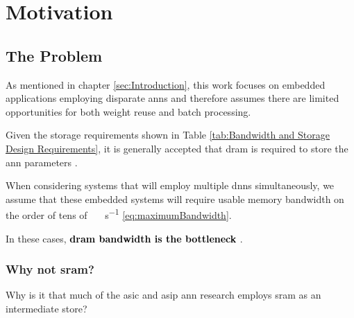 



\section{Motivation}
\label{sec:Motivation}


\subsection[The Problem]{The Problem}
\label{sec:The Problem}

As mentioned in chapter \ref{sec:Introduction}, this work focuses on embedded applications employing disparate \ac{ann}s and therefore assumes there are limited opportunities for both weight reuse and batch processing.

Given the storage requirements shown in Table \ref{tab:Bandwidth and Storage Design Requirements}, it is generally accepted that \ac{dram} is required to store the \ac{ann} parameters \cite{dadiannao2014}\cite{dadiannao2017}\cite{azarkhish2017neurostream}.

When considering systems that will employ multiple \ac{dnn}s simultaneously, we assume that these embedded systems will require usable memory bandwidth on the order of tens of \SI[per-mode=symbol]{}{\tera \bit \per \second} \eqref{eq:maximumBandwidth}.

In these cases, \textbf{\textcolor{black}{\ac{dram} bandwidth is the bottleneck} \cite{dadiannao2017}}.

\iffalse
Given the bandwidth and storage requirements shown in Table \ref{tab:Bandwidth and Storage Design Requirements}, the problem becomes \hyphenquote{american}{\textbf{\textcolor{black}{to provide deterministic at or near real-time performance within tolerable power and space constraints for embedded systems employing inference on multiple disparate useful-sized neural networks.}}}
\fi


\subsubsection{Why not \ac{sram}?}
\label{sec:Why not SRAM}

Why is it that much of the \ac{asic} and \ac{asip} \ac{ann} research employs \ac{sram} as an intermediate store? 

